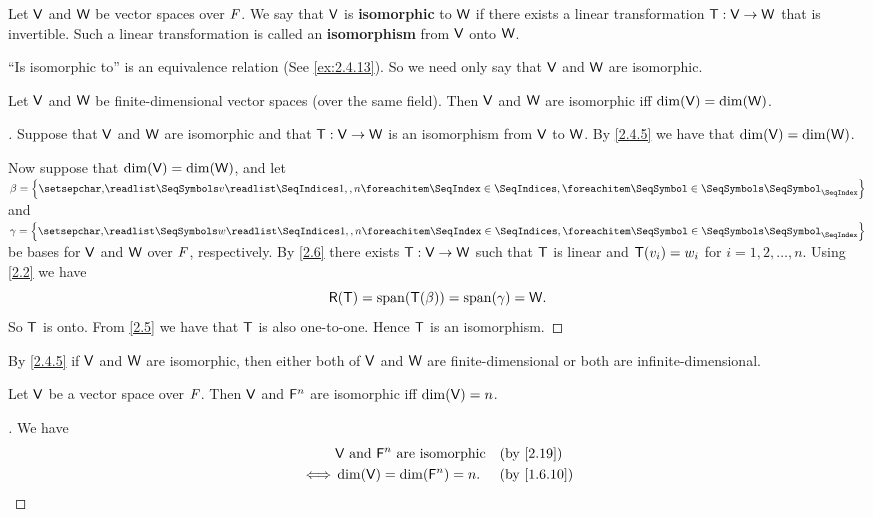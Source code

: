 \begin{defn}\label{2.4.8}
	Let \(\mathsf{V}\) and \(\mathsf{W}\) be vector spaces over \(\mathit{F}\).
	We say that \(\mathsf{V}\) is \textbf{isomorphic} to \(\mathsf{W}\) if there exists a linear transformation \(\mathsf{T} : \mathsf{V} \to \mathsf{W}\) that is invertible.
	Such a linear transformation is called an \textbf{isomorphism} from \(\mathsf{V}\) onto \(\mathsf{W}\).
\end{defn}

\begin{note}
	``Is isomorphic to'' is an equivalence relation (See \cref{ex:2.4.13}).
	So we need only say that \(\mathsf{V}\) and \(\mathsf{W}\) are isomorphic.
\end{note}

\begin{thm}\label{2.19}
	Let \(\mathsf{V}\) and \(\mathsf{W}\) be finite-dimensional vector spaces (over the same field).
	Then \(\mathsf{V}\) and \(\mathsf{W}\) are isomorphic iff \(\dim(\mathsf{V}) = \dim(\mathsf{W})\).
\end{thm}

\begin{proof}[]
	Suppose that \(\mathsf{V}\) and \(\mathsf{W}\) are isomorphic and that \(\mathsf{T} : \mathsf{V} \to \mathsf{W}\) is an isomorphism from \(\mathsf{V}\) to \(\mathsf{W}\).
	By \cref{2.4.5} we have that \(\dim(\mathsf{V}) = \dim(\mathsf{W})\).

	Now suppose that \(\dim(\mathsf{V}) = \dim(\mathsf{W})\), and let \(\beta = \set{\seq{v}{1,,n}}\) and \(\gamma = \set{\seq{w}{1,,n}}\) be bases for \(\mathsf{V}\) and \(\mathsf{W}\) over \(\mathit{F}\), respectively.
	By \cref{2.6} there exists \(\mathsf{T} : \mathsf{V} \to \mathsf{W}\) such that \(\mathsf{T}\) is linear and \(\mathsf{T}(v_i) = w_i\) for \(i = 1, 2, \dots, n\).
	Using \cref{2.2} we have
	\[
		\rg{\T} = \spn{\T(\beta)} = \spn{\gamma} = \W.
	\]
	So \(\mathsf{T}\) is onto.
	From \cref{2.5} we have that \(\mathsf{T}\) is also one-to-one.
	Hence \(\mathsf{T}\) is an isomorphism.
\end{proof}

\begin{note}
	By \cref{2.4.5} if \(\mathsf{V}\) and \(\mathsf{W}\) are isomorphic, then either both of \(\mathsf{V}\) and \(\mathsf{W}\) are finite-dimensional or both are infinite-dimensional.
\end{note}

\begin{cor}\label{2.4.9}
	Let \(\mathsf{V}\) be a vector space over \(\mathit{F}\).
	Then \(\mathsf{V}\) and \(\mathsf{F}^n\) are isomorphic iff \(\dim(\mathsf{V}) = n\).
\end{cor}

\begin{proof}[]
	We have
	\begin{align*}
		     & \V \text{ and } \vs{F}^n \text{ are isomorphic} &  & \by{2.19}   \\
		\iff & \dim(\V) = \dim(\vs{F}^n) = n.                  &  & \by{1.6.10}
	\end{align*}
\end{proof}

